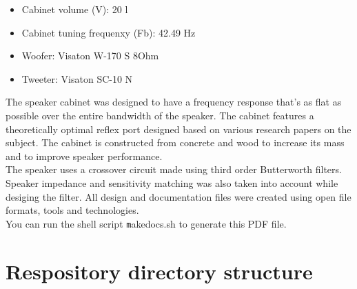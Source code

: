 \documentclass[10pt]{article}
\begin{document}
\begin{itemize}
\item Cabinet volume (V): 20 l
\item Cabinet tuning frequenxy (Fb): 42.49 Hz
\item Woofer: Visaton W-170 S 8Ohm
\item Tweeter: Visaton SC-10 N
\end{itemize}

\noindent The speaker cabinet was designed to have a frequency response that's
as flat as possible over the entire bandwidth of the speaker. The cabinet
features a theoretically optimal reflex port designed based on various research
papers on the subject. The cabinet is constructed from concrete and wood to
increase its mass and to improve speaker performance.\\

\noindent The speaker uses a crossover circuit made using third order
Butterworth filters. Speaker impedance and sensitivity matching was also taken
into account while desiging the filter. All design and documentation files were
created using open file formats, tools and technologies.\\

\noindent You can run the shell script \texttt makedocs.sh to generate this
PDF file.

\section{Respository directory structure}
\end{document}
